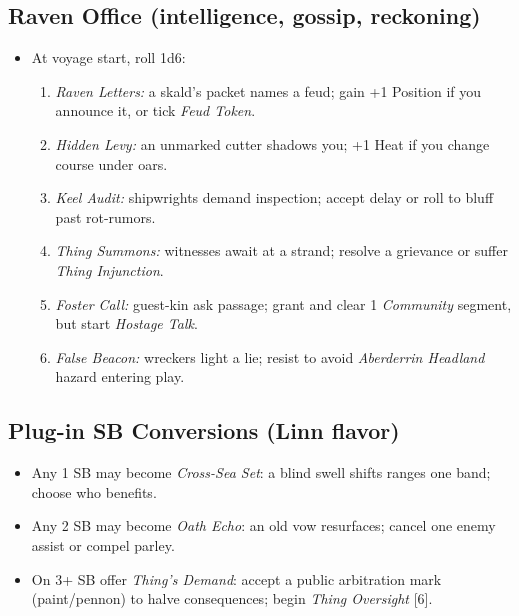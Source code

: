\subsection*{Raven Office (intelligence, gossip, reckoning)}
\begin{itemize}
  \item At voyage start, roll 1d6:
  \begin{enumerate}
    \item \emph{Raven Letters:} a skald’s packet names a feud; gain +1 Position if you announce it, or tick \emph{Feud Token}.
    \item \emph{Hidden Levy:} an unmarked cutter shadows you; +1 Heat if you change course under oars.
    \item \emph{Keel Audit:} shipwrights demand inspection; accept delay or roll to bluff past rot-rumors.
    \item \emph{Thing Summons:} witnesses await at a strand; resolve a grievance or suffer \emph{Thing Injunction}.
    \item \emph{Foster Call:} guest-kin ask passage; grant and clear 1 \emph{Community} segment, but start \emph{Hostage Talk}.
    \item \emph{False Beacon:} wreckers light a lie; resist to avoid \emph{Aberderrin Headland} hazard entering play.
  \end{enumerate}
\end{itemize}

\subsection*{Plug-in SB Conversions (Linn flavor)}
\begin{itemize}
  \item Any 1 SB may become \emph{Cross-Sea Set}: a blind swell shifts ranges one band; choose who benefits.
  \item Any 2 SB may become \emph{Oath Echo}: an old vow resurfaces; cancel one enemy assist or compel parley.
  \item On 3+ SB offer \emph{Thing’s Demand}: accept a public arbitration mark (paint/pennon) to halve consequences; begin \emph{Thing Oversight} [6].
\end{itemize}